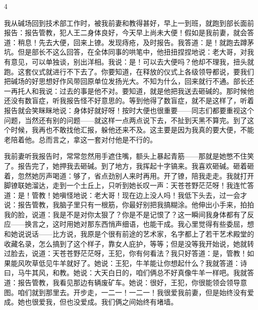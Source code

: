 4 

我从碱场回到技术部工作时，被我前妻和教得甚好，早上一到班，就跑到部长面前报告：报告管教，犯人王二身体良好，今天早上尚未大便！假如是我前妻，就会答道：稍息！先去大便，回来上镣。发现痔疮，及时报告。我答道：是！就跑去蹲茅坑。但是部长不这么回答，在全体同事的哄笔中，他扭扭捏捏地说：老大哥，对我有意见，可以单独谈，别出洋相。我说：是！可以去大便吗？他却不理我，扭头就跑。这套仪式就进行不下去了。你要知道，在释放的仪式上各级领导都说，要我们把碱场的好思想好作风带回原单位发扬光大。不知为什么，回来就行不通。部长还一再托人和我说：过去的事是他不对。要知道，就是他把我送去砸碱的。那时候他还没有数盲症，听我报告怪不好意思的。等到他得了数盲症，就不是这样了，听着报告就会笑眯眯地说：身体好就好呀！按时大便也很重要——同志们都要重视这个问题，当然还有别的问题——就这样一点两点说下去，不扯到天黑不算完。到了这个时候，我再也不敢找他汇报，躲他还来不及。这主要是因为我真的要大便，不能老陪着他。总而言之，拿这一套对付他是不行的。 

我前妻听我报告时，常常忽然用手遮住嘴，额头上暴起青筋——那就是她憋不住笑了。报告完了，她押我去砸碱。到了地方，我挥起十字镐来。我喜欢砸碱。砸着砸着，忽然她厉声喝道：够了，省点劲别人来时再用。开了镣，陪我走走。我就打开脚镣联她溜达，走到一个土丘上，只听到她长叹一声：天苍苍野茫茫呀！我连忙答道：是！管教！她嗔怪地说：老大哥！现在边上没人吗！我低下头去，过一会才说：报告管教，我脑子里只有一根筋，你最好别把我搞糊涂。他伸出小手来，拍拍我的脸，说道：我是不是对你太狠了？你是不是记恨了？这一瞬间我身体都有了反应——换言之，这时用她对那东西悄声细语，也能干成。我心里觉得有些委屈，想和她说说话——比方说，我原是个很有前途的艺术家，名字都上了若干艺术殿堂的收藏名录，怎么搞到了这个样子，靠女人庇护，等等；但是没等我开始说，她就转过脸去，说道：天苍苍野茫茫呀，王犯，你有何看法？我只好答道：是，管教！如果能风吹草低见牛羊就好了。她说：王犯，牛羊能让你想起什么？我就答道：诗曰，马牛其风，和教。她说：大天白日的，咱们俩总不好真像牛羊一样吧。我就答道：报告管教，我看见那边有辆废矿车。她说：很好，王犯，你很能领会领导意图。咱们就到那里去。开步走，一二一！一二一！我很爱我前妻，但是始终没有爱成。她也很爱我，但也没爱成。我们俩之间始终有堵墙。 


